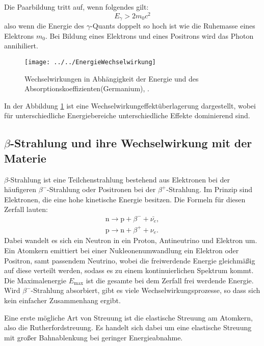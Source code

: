 Die Paarbildung tritt auf, wenn folgendes gilt:
\begin{equation*}
E_\gamma > 2m_0c^2
\end{equation*}
also wenn die Energie des $\gamma$-Quants doppelt so hoch ist wie die Ruhemasse eines Elektrons $m_0$. Bei Bildung eines Elektrons und eines Positrons wird das Photon annihiliert. 

\begin{figure}[h!]
	\centering
	\texttt{[image: ../../EnergieWechselwirkung]}
	\caption{Wechselwirkungen in Abhängigkeit der Energie und des Absorptionskoeffizienten(Germanium), \cite[7]{anleitung704}.}
	\label{fig:energiewechselwirkung}
\end{figure}

In der Abbildung \ref{fig:energiewechselwirkung} ist eine Wechselwirkungeffektüberlagerung dargestellt, wobei für unterschiedliche Energiebereiche unterschiedliche Effekte dominierend sind. 

\subsection{\texorpdfstring{$\beta$}{beta}-Strahlung und ihre Wechselwirkung mit der Materie}

$\beta$-Strahlung ist eine Teilchenstrahlung bestehend aus Elektronen bei der häufigeren $\beta^{-}$-Strahlung oder Positronen bei der $\beta^{+}$-Strahlung. Im Prinzip sind Elektronen, die eine hohe kinetische Energie besitzen.
Die Formeln für diesen Zerfall lauten:
\begin{align*}
\text{n} \rightarrow \text{p} + \beta^{-} + \bar{\nu_e}, \\
\text{p} \rightarrow \text{n} + \beta^{+} + \nu_e.
\end{align*}
Dabei wandelt es sich ein Neutron in ein Proton, Antineutrino und Elektron um. Ein Atomkern emittiert bei einer Nukleonenumwandlung ein Elektron oder Positron, samt passendem Neutrino, wobei die freiwerdende Energie gleichmäßig auf diese verteilt werden, sodass es zu einem kontinuierlichen Spektrum kommt. Die Maximalenergie $E_\text{max}$ ist die gesamte bei dem Zerfall frei werdende Energie. 
Wird $\beta^{-}$-Strahlung absorbiert, gibt es viele Wechselwirkungsprozesse, so dass sich kein einfacher Zusammenhang ergibt. 

Eine erste mögliche Art von Streuung ist die elastische Streuung am Atomkern, also die Rutherfordstreuung. Es handelt sich dabei um eine elastische Streuung mit großer Bahnablenkung bei geringer Energieabnahme.

